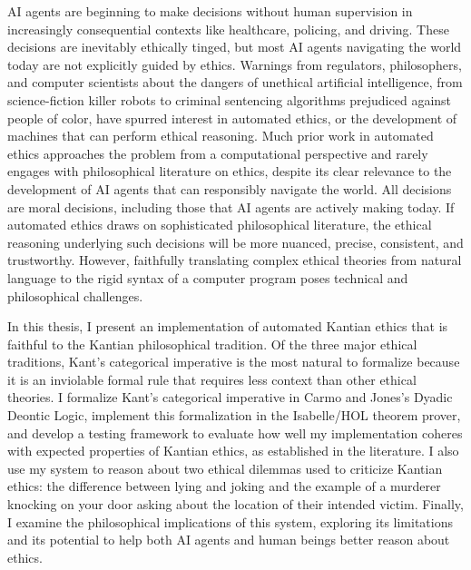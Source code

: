 %
\begin{isabellebody}%
%
%
\isadelimtheory
%
\endisadelimtheory
%
\isatagtheory
%
\endisatagtheory
{\isafoldtheory}%
%
\isadelimtheory
%
\endisadelimtheory
%
\begin{isamarkuptext}%
AI agents are beginning to make decisions without human supervision in increasingly consequential 
contexts like healthcare, policing, and driving. These decisions are inevitably ethically tinged, 
but most AI agents navigating the world today are not explicitly guided by ethics.
Warnings from regulators, philosophers, and computer scientists about the 
dangers of unethical artificial intelligence, from science-fiction killer robots to criminal
sentencing algorithms prejudiced against people of color, have spurred interest in automated ethics, or the development 
of machines that can perform ethical reasoning. Much prior work in automated ethics approaches the 
problem from a computational perspective and rarely engages with philosophical literature on ethics, despite
its clear relevance to the development of AI agents that can
responsibly navigate the world. All decisions are moral decisions, including those that AI agents are actively 
making today. If automated ethics draws on sophisticated philosophical literature, the ethical reasoning
underlying such decisions will be more nuanced, precise, consistent, and trustworthy. However, faithfully translating complex ethical theories
from natural language to the rigid syntax of a computer program poses technical and philosophical 
challenges. 

In this thesis, I present an implementation of automated Kantian
ethics that is faithful to the Kantian philosophical tradition. Of the three major ethical
traditions, Kant's categorical imperative is the most natural to formalize because it is an inviolable 
formal rule that requires less context than other ethical theories. I formalize Kant's categorical imperative 
in Carmo and Jones's Dyadic Deontic Logic, implement this formalization 
in the Isabelle/HOL theorem prover, and develop a testing framework to evaluate how well 
my implementation coheres with expected properties of Kantian ethics, as established in the literature. 
I also use my system to reason about two ethical dilemmas used to criticize Kantian ethics: the difference
between lying and joking and the example of a murderer knocking on your door asking about the location of their
intended victim. Finally, I examine the philosophical implications of this system, exploring its limitations 
and its potential to help both AI agents and human beings better reason about ethics. 


\end{isamarkuptext}
\end{isabellebody}
